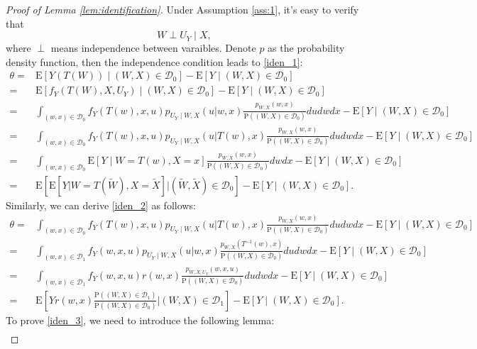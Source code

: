 \documentclass[11pt]{article}
\def\P{{\mathrm P}}
\def\E{{\mathrm E}}
\numberwithin{equation}{section}
\theoremstyle{definition}
\begin{document}
\begin{proof}[Proof of Lemma \ref{lem:identification}]
    Under Assumption \ref{ass:1}, it's easy to verify that
    \begin{equation}\label{ignor:1}
        W\perp U_Y\mid X,
    \end{equation}
    where $\perp$ means independence between varaibles. Denote $p$ as the probability density function, then the independence condition leads to \eqref{iden_1}:
    \begin{align*}
        \theta=&\E[Y(T(W))\mid (W,X)\in\mathcal{D}_0]-\E[Y\mid (W,X)\in\mathcal{D}_0]\\
        =&\E[f_Y(T(W),X,U_Y)\mid (W,X)\in\mathcal{D}_0]-\E[Y\mid (W,X)\in\mathcal{D}_0]\\
        =&\int_{(w,x)\in\mathcal{D}_0}f_Y(T(w),x,u)p_{U_Y\mid W,X}(u|w,x)\frac{p_{W,X}(w,x)}{\P((W,X)\in\mathcal{D}_0)}dudwdx-\E[Y\mid (W,X)\in\mathcal{D}_0]\\
        =&\int_{(w,x)\in\mathcal{D}_0}f_Y(T(w),x,u)p_{U_Y\mid W,X}(u|T(w),x)\frac{p_{W,X}(w,x)}{\P((W,X)\in\mathcal{D}_0)}dudwdx-\E[Y\mid (W,X)\in\mathcal{D}_0]\\
        =&\int_{(w,x)\in\mathcal{D}_0}\E[Y\mid W=T(w),X=x]\frac{p_{W,X}(w,x)}{\P((W,X)\in\mathcal{D}_0)}dwdx-\E[Y\mid (W,X)\in\mathcal{D}_0]\\
        =&\E\left[\E\left[Y|W=T(\tilde{W}), X=\tilde{X}\right]|(\tilde{W},\tilde{X}) \in \mathcal{D}_0\right]-\E[Y\mid (W,X)\in\mathcal{D}_0].
    \end{align*}
    Similarly, we can derive \eqref{iden_2} as follows:
    \begin{align*}
        \theta=&\int_{(w,x)\in\mathcal{D}_0}f_Y(T(w),x,u)p_{U_Y\mid W,X}(u|T(w),x)\frac{p_{W,X}(w,x)}{\P((W,X)\in\mathcal{D}_0)}dudwdx-\E[Y\mid (W,X)\in\mathcal{D}_0]\\
        =&\int_{(w,x)\in\mathcal{D}_1}f_Y(w,x,u)p_{U_Y\mid W,X}(u|w,x)\frac{p_{W,X}(T^{-1}(w),x)}{\P((W,X)\in\mathcal{D}_0)}dudwdx-\E[Y\mid (W,X)\in\mathcal{D}_0]\\
        =&\int_{(w,x)\in\mathcal{D}_1}f_Y(w,x,u)r(w,x)\frac{p_{W,X,U_Y}(w,x,u)}{\P((W,X)\in\mathcal{D}_0)}dudwdx-\E[Y\mid (W,X)\in\mathcal{D}_0]\\
        =&\E\left[Yr(w,x)\frac{\P((W,X)\in\mathcal{D}_1)}{\P((W,X)\in\mathcal{D}_0)}|(W,X) \in \mathcal{D}_1\right]-\E[Y\mid (W,X)\in\mathcal{D}_0].
    \end{align*}
    To prove \eqref{iden_3}, we need to introduce the following lemma:
    \begin{align*}

\end{align*}
\end{proof}
\end{document}
